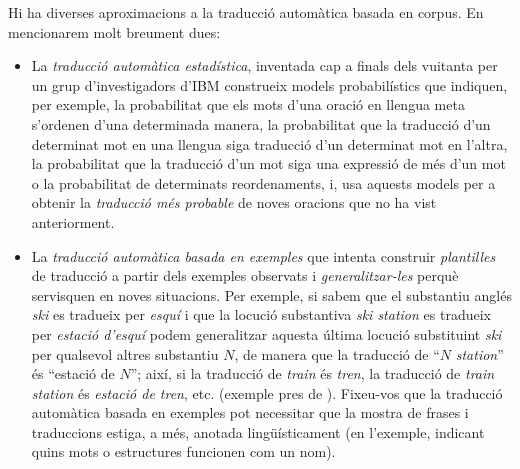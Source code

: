 Hi ha diverses aproximacions a la traducció automàtica basada en
corpus. En mencionarem molt breument dues:
\begin{itemize}
\item La \emph{traducció automàtica estadística},
inventada cap a finals dels vuitanta per un grup d'investigadors d'IBM
\citep{brown90j} construeix models probabilístics que indiquen, per
exemple, la probabilitat que els mots d'una oració en llengua meta
s'ordenen d'una determinada manera, la probabilitat que la traducció
d'un determinat mot en una llengua siga traducció d'un determinat mot
en l'altra, la probabilitat que la traducció d'un mot siga una
expressió de més d'un mot o la probabilitat de determinats
reordenaments, i, usa aquests models per a obtenir la \emph{traducció
  més probable} de noves oracions que no ha vist anteriorment. 
\item La \emph{traducció automàtica basada en exemples} que intenta
construir \emph{plantilles} de traducció a partir dels exemples
observats i \emph{generalitzar-les} perquè servisquen en noves
situacions. Per exemple, si sabem que el substantiu anglés \emph{ski}
es tradueix per \emph{esquí} i que la locució substantiva \emph{ski
  station} es tradueix per \emph{estació d'esquí} podem generalitzar
aquesta última locució substituint \emph{ski} per qualsevol altres
substantiu $N$, de manera que la traducció de ``$N$ \emph{station}''
és ``estació de $N$''; així, si la traducció de \emph{train} és
\emph{tren}, la traducció de \emph{train station} és \emph{estació de
  tren}, etc. (exemple pres de \citealt{carl01j}). Fixeu-vos que la traducció automàtica basada en exemples
pot necessitar que la mostra de frases i traduccions estiga, a més,
anotada lingüísticament (en l'exemple, indicant quins mots o
estructures funcionen com un nom).
\end{itemize}







